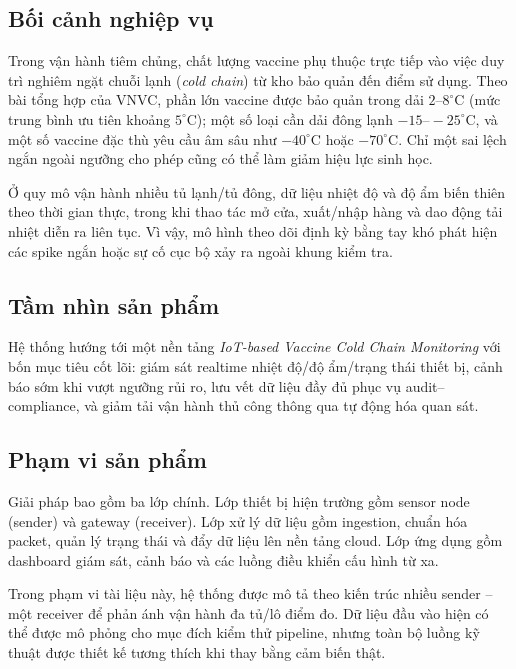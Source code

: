 \documentclass[12pt,a4paper]{report}
\begin{document}
\subsection{Bối cảnh nghiệp vụ}
Trong vận hành tiêm chủng, chất lượng vaccine phụ thuộc trực tiếp vào việc duy trì nghiêm ngặt chuỗi lạnh (\textit{cold chain}) từ kho bảo quản đến điểm sử dụng. Theo bài tổng hợp của VNVC, phần lớn vaccine được bảo quản trong dải \(2\text{--}8^\circ\mathrm{C}\) (mức trung bình ưu tiên khoảng \(5^\circ\mathrm{C}\)); một số loại cần dải đông lạnh \(-15\text{--}-25^\circ\mathrm{C}\), và một số vaccine đặc thù yêu cầu âm sâu như \(-40^\circ\mathrm{C}\) hoặc \(-70^\circ\mathrm{C}\). Chỉ một sai lệch ngắn ngoài ngưỡng cho phép cũng có thể làm giảm hiệu lực sinh học.

Ở quy mô vận hành nhiều tủ lạnh/tủ đông, dữ liệu nhiệt độ và độ ẩm biến thiên theo thời gian thực, trong khi thao tác mở cửa, xuất/nhập hàng và dao động tải nhiệt diễn ra liên tục. Vì vậy, mô hình theo dõi định kỳ bằng tay khó phát hiện các spike ngắn hoặc sự cố cục bộ xảy ra ngoài khung kiểm tra.

\subsection{Tầm nhìn sản phẩm}
Hệ thống hướng tới một nền tảng \textit{IoT-based Vaccine Cold Chain Monitoring} với bốn mục tiêu cốt lõi: giám sát realtime nhiệt độ/độ ẩm/trạng thái thiết bị, cảnh báo sớm khi vượt ngưỡng rủi ro, lưu vết dữ liệu đầy đủ phục vụ audit--compliance, và giảm tải vận hành thủ công thông qua tự động hóa quan sát.

\subsection{Phạm vi sản phẩm}
Giải pháp bao gồm ba lớp chính. Lớp thiết bị hiện trường gồm sensor node (sender) và gateway (receiver). Lớp xử lý dữ liệu gồm ingestion, chuẩn hóa packet, quản lý trạng thái và đẩy dữ liệu lên nền tảng cloud. Lớp ứng dụng gồm dashboard giám sát, cảnh báo và các luồng điều khiển cấu hình từ xa.

Trong phạm vi tài liệu này, hệ thống được mô tả theo kiến trúc nhiều sender -- một receiver để phản ánh vận hành đa tủ/lô điểm đo. Dữ liệu đầu vào hiện có thể được mô phỏng cho mục đích kiểm thử pipeline, nhưng toàn bộ luồng kỹ thuật được thiết kế tương thích khi thay bằng cảm biến thật.
\end{document}
